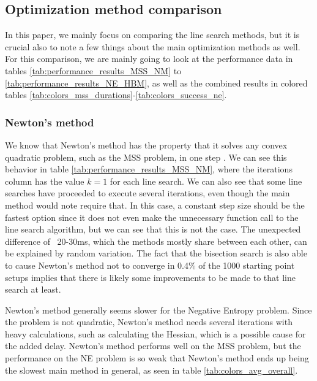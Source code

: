\documentclass[english, 12pt, a4paper, sci, utf8, a-1b, online, table]{aaltothesis}
\begin{document}

\subsection{Optimization method comparison}

In this paper, we mainly focus on comparing the line search methods, but it is crucial also to note a few things about the main optimization methods as well. For this comparison, we are mainly going to look at the performance data in tables \ref{tab:performance_results_MSS_NM} to \ref{tab:performance_results_NE_HBM}, as well as the combined results in colored tables \ref{tab:colors_mss_durations}-\ref{tab:colors_success_ne}.

\subsubsection*{Newton's method}

We know that Newton's method has the property that it solves any convex quadratic problem, such as the MSS problem, in one step \cite{book:convex_optimization}. We can see this behavior in table \ref{tab:performance_results_MSS_NM}, where the iterations column has the value $k = 1$ for each line search. We can also see that some line searches have proceeded to execute several iterations, even though the main method would note require that. In this case, a constant step size should be the fastest option since it does not even make the unnecessary function call to the line search algorithm, but we can see that this is not the case. The unexpected difference of ~20-30ms, which the methods mostly share between each other, can be explained by random variation. The fact that the bisection search is also able to cause Newton's method not to converge in 0.4\% of the 1000 starting point setups implies that there is likely some improvements to be made to that line search at least. 

Newton's method generally seems slower for the Negative Entropy problem. Since the problem is not quadratic, Newton's method needs several iterations with heavy calculations, such as calculating the Hessian, which is a possible cause for the added delay. Newton's method performs well on the MSS problem, but the performance on the NE problem is so weak that Newton's method ends up being the slowest main method in general, as seen in table \ref{tab:colors_avg_overall}.
\end{document}
